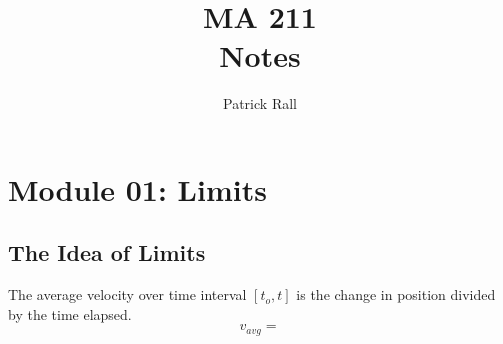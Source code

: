\documentclass{report}
\title{\Huge{MA 211}\\Notes}
\author{\huge{Patrick Rall}}
\date{}
\begin{document}
\maketitle
\newpage%
\tableofcontents
\pagebreak
\chapter{Module 01: Limits}
\section{The Idea of Limits}
The average velocity over time interval $[t_o,t]$ is the change in position divided by the time elapsed.
\begin{equation}
v_{avg}=
\end{equation}
\end{document}
